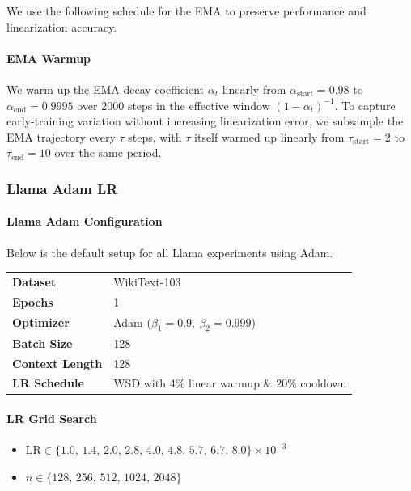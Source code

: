 We use the following schedule for the EMA to preserve performance and linearization accuracy.

\paragraph{EMA Warmup}  
We warm up the EMA decay coefficient \(\alpha_t\) linearly from \(\alpha_{\mathrm{start}}=0.98\) to \(\alpha_{\mathrm{end}}=0.9995\) over 2000 steps in the effective window \((1-\alpha_t)^{-1}\). To capture early-training variation without increasing linearization error, we subsample the EMA trajectory every \(\tau\) steps, with \(\tau\) itself warmed up linearly from \(\tau_{\mathrm{start}}=2\) to \(\tau_{\mathrm{end}}=10\) over the same period.

\subsubsection{Llama Adam LR}\label{app:llama_adam_lr}
\paragraph{Llama Adam Configuration}
Below is the default setup for all Llama experiments using Adam.  

\begin{table}[ht]
\centering
\small
\renewcommand{\arraystretch}{1.2}
\begin{tabular}{@{}ll@{}}
\toprule
\textbf{Dataset}       & WikiText-103                                        \\ 
\addlinespace
\textbf{Epochs}        & 1                                                   \\ 
\addlinespace
\textbf{Optimizer}     & Adam ($\beta_1=0.9,\ \beta_2=0.999$) \\

\addlinespace
\textbf{Batch Size}     & 128 \\

\addlinespace
\textbf{Context Length}     & 128 \\

\addlinespace
\textbf{LR Schedule}   & WSD with 4\% linear warmup \& 20\% cooldown         \\ 
\bottomrule
\end{tabular}
\end{table}



\paragraph{LR Grid Search}
\begin{itemize}[nosep,leftmargin=*]
  \item \(\displaystyle \mathrm{LR} \in \{1.0,\,1.4,\,2.0,\,2.8,\,4.0,\,4.8,\,5.7,\,6.7,\,8.0\}\times10^{-3}\)
  
  \vspace{2mm}
  
  \item \(n \in \{128,\,256,\,512,\,1024,\,2048\}\)
\end{itemize}

